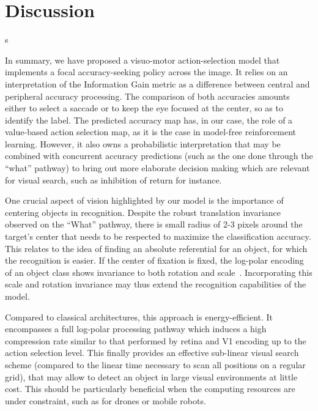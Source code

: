 \section{Discussion}
\label{sec:discussion}

s


In summary, we have proposed a visuo-motor action-selection model that implements a focal accuracy-seeking policy across the image. It relies on an interpretation of the Information Gain metric as a difference between central and peripheral accuracy processing.  The comparison of both accuracies amounts either to select a saccade or to keep the eye focused at the center, so as to identify the label. The predicted accuracy map has, in our case, the role of a value-based action selection map, as it is the case in model-free reinforcement learning. However, it also owns a probabilistic interpretation that may be combined with concurrent accuracy predictions (such as the one done through the ``what'' pathway) to bring out more elaborate decision making which are relevant for visual search, such as inhibition of return for instance. 

One crucial aspect of vision highlighted by our model is the importance of centering objects in recognition. Despite the robust translation invariance observed on the ``What'' pathway, there is small radius of 2-3 pixels around the target's center that needs to be respected to maximize the classification accuracy. This relates to the idea of finding an absolute referential for an object, for which the recognition is easier. If the center of fixation is fixed, the log-polar encoding of an object class shows invariance to both rotation and scale~\citep{Traver10}. Incorporating this scale and rotation invariance may thus extend the recognition capabilities of the model.


Compared to classical architectures, this approach is energy-efficient. It encompasses a full log-polar processing pathway which induces a high compression rate similar to that performed by retina and V1 encoding up to the action selection level. This finally provides an effective sub-linear visual search scheme (compared to the linear time necessary to scan all positions on a regular grid), that may allow to detect an object in large visual environments at little cost. This should be particularly beneficial when the computing resources are under constraint, such as for drones or mobile robots. 

